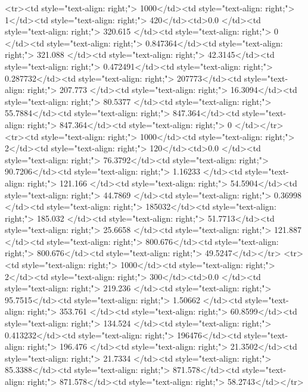 <tr><td style="text-align: right;">      1000</td><td style="text-align: right;">         1</td><td style="text-align: right;">           420</td><td>0.0          </td><td style="text-align: right;">               320.615 </td><td style="text-align: right;">             0     </td><td style="text-align: right;">         0.847364</td><td style="text-align: right;">        321.088 </td><td style="text-align: right;">            42.3145</td><td style="text-align: right;">               0.472491</td><td style="text-align: right;">             0.287732</td><td style="text-align: right;">              207773</td><td style="text-align: right;">                      207.773 </td><td style="text-align: right;">            16.3094</td><td style="text-align: right;">                80.5377 </td><td style="text-align: right;">        55.7884</td><td style="text-align: right;">    847.364</td><td style="text-align: right;">       847.364</td><td style="text-align: right;">                  0     </td></tr>
<tr><td style="text-align: right;">      1000</td><td style="text-align: right;">         2</td><td style="text-align: right;">           120</td><td>0.0          </td><td style="text-align: right;">                76.3792</td><td style="text-align: right;">            90.7206</td><td style="text-align: right;">         1.16233 </td><td style="text-align: right;">        121.166 </td><td style="text-align: right;">            54.5904</td><td style="text-align: right;">              44.7869  </td><td style="text-align: right;">             0.36998 </td><td style="text-align: right;">              185032</td><td style="text-align: right;">                      185.032 </td><td style="text-align: right;">            51.7713</td><td style="text-align: right;">                25.6658 </td><td style="text-align: right;">       121.887 </td><td style="text-align: right;">    800.676</td><td style="text-align: right;">       800.676</td><td style="text-align: right;">                 49.5247</td></tr>
<tr><td style="text-align: right;">      1000</td><td style="text-align: right;">         2</td><td style="text-align: right;">           300</td><td>0.0          </td><td style="text-align: right;">               219.236 </td><td style="text-align: right;">            95.7515</td><td style="text-align: right;">         1.50662 </td><td style="text-align: right;">        353.761 </td><td style="text-align: right;">            60.8599</td><td style="text-align: right;">             134.524   </td><td style="text-align: right;">             0.413232</td><td style="text-align: right;">              196476</td><td style="text-align: right;">                      196.476 </td><td style="text-align: right;">            21.3502</td><td style="text-align: right;">                21.7334 </td><td style="text-align: right;">        85.3388</td><td style="text-align: right;">    871.578</td><td style="text-align: right;">       871.578</td><td style="text-align: right;">                 58.2743</td></tr>
